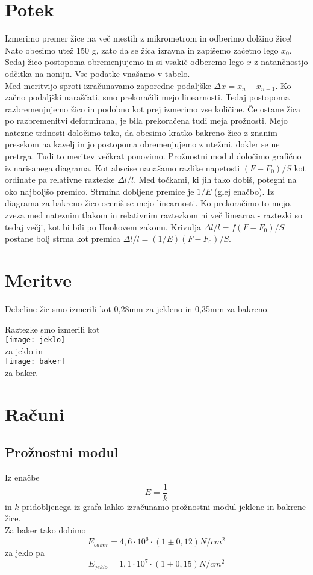 \documentclass[a4paper]{report}
\begin{document}
\chapter*{Potek}
Izmerimo premer žice na več mestih z mikrometrom in odberimo dolžino žice! Nato obesimo utež 150 g, zato da se žica izravna in zapišemo začetno lego $x_0$. Sedaj žico postopoma  obremenjujemo in si vsakič odberemo lego $x$ z natančnostjo odčitka na noniju. Vse podatke vnašamo v tabelo.\\
Med meritvijo sproti izračunavamo zaporedne podaljške $\Delta x=x_n -x_{n-1}$. Ko začno podaljški naraščati, smo prekoračili mejo linearnosti. Tedaj postopoma razbremenjujemo žico in podobno kot prej izmerimo vse količine. Če ostane žica po razbremenitvi deformirana, je bila prekoračena tudi meja prožnosti. 
Mejo natezne trdnosti določimo tako, da obesimo kratko bakreno žico z znanim presekom na kavelj in jo postopoma obremenjujemo z utežmi, dokler se ne pretrga. Tudi to meritev večkrat ponovimo.
Prožnostni modul določimo grafično iz narisanega diagrama. Kot abscise nanašamo razlike napetosti $(F-F_0)/S$ kot ordinate pa relativne raztezke $\Delta l/l$. Med točkami, ki jih tako dobiš, potegni na oko najboljšo premico. Strmina dobljene premice je $1/E$ (glej enačbo). Iz diagrama za bakreno žico oceniš se mejo linearnosti. Ko prekoračimo to mejo, zveza med nateznim tlakom in relativnim raztezkom ni več linearna - raztezki so tedaj večji, kot bi bili po Hookovem zakonu. Krivulja $\Delta l/l = f(F -F_0)/S$ postane bolj strma kot premica $\Delta l/l =(1/E) (F -F_0)/S $.

\chapter*{Meritve}
Debeline žic smo izmerili kot 0,28mm za jekleno in 0,35mm za bakreno.

Raztezke smo izmerili kot\\
\texttt{[image: jeklo]}\\
za jeklo in \\
\texttt{[image: baker]}\\
za baker.
\chapter*{Računi}
\section*{Prožnostni modul}
Iz enačbe
\[E=\frac{1}{k}\]
in $k$  pridobljenega iz grafa lahko izračunamo prožnostni modul jeklene in bakrene žice.\\
Za baker tako dobimo
\[E_{baker}=4,6\cdot 10^6\cdot(1\pm0,12)N/cm^2\]
za jeklo pa
\[E_{jeklo}=1,1\cdot 10^7\cdot(1\pm0,15)N/cm^2\]
\end{document}
